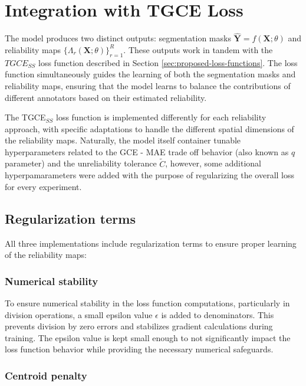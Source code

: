 \section{Integration with TGCE Loss}

The model produces two distinct outputs: segmentation masks
$\mathbf{\hat{Y}} = f(\mathbf{X};\theta)$ and reliability maps
$\{\Lambda_r(\mathbf{X};\theta)\}_{r=1}^R$. These outputs work in
tandem with the $TGCE_{SS}$ loss function described in Section
\ref{sec:proposed-loss-functions}. The loss function simultaneously guides the
learning of both the segmentation masks and reliability maps,
ensuring that the model learns to balance the contributions of
different annotators based on their estimated reliability.

The TGCE$_{SS}$ loss function is implemented differently for each reliability
approach, with specific adaptations to handle the different spatial dimensions
of the reliability maps. Naturally, the model itself container tunable
hyperparameters related to the \gls{GCE} - \gls{MAE} trade off behavior
(also known as $q$ parameter) and the unreliability tolerance $\tilde C$,
however, some additional hyperpamarameters were added with the purpose of
regularizing the overall loss for every experiment.

\subsection{Regularization terms}\label{sec:regularizers}

All three implementations include regularization terms to ensure
proper learning of the reliability maps:

\subsubsection{Numerical stability}
To ensure numerical stability in the loss function computations,
particularly in division operations, a small epsilon value $\epsilon$
is added to denominators. This prevents division by zero
errors and stabilizes gradient calculations during training. The
epsilon value is kept small enough to not significantly impact the
loss function behavior while providing the necessary numerical safeguards.

\subsubsection{Centroid penalty}

